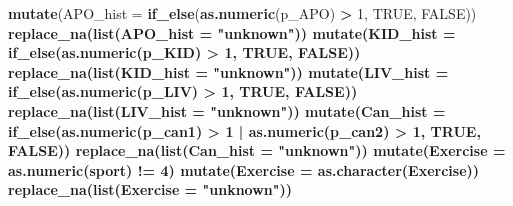 \documentclass[
]{article}
\newenvironment{Shaded}{\begin{snugshade}}{\end{snugshade}}
\newcommand{\CommentTok}[1]{\textcolor[rgb]{0.56,0.35,0.01}{\textit{#1}}}
\newcommand{\DataTypeTok}[1]{\textcolor[rgb]{0.13,0.29,0.53}{#1}}
\newcommand{\DecValTok}[1]{\textcolor[rgb]{0.00,0.00,0.81}{#1}}
\newcommand{\KeywordTok}[1]{\textcolor[rgb]{0.13,0.29,0.53}{\textbf{#1}}}
\newcommand{\NormalTok}[1]{#1}
\newcommand{\OperatorTok}[1]{\textcolor[rgb]{0.81,0.36,0.00}{\textbf{#1}}}
\newcommand{\OtherTok}[1]{\textcolor[rgb]{0.56,0.35,0.01}{#1}}
\newcommand{\StringTok}[1]{\textcolor[rgb]{0.31,0.60,0.02}{#1}}
\begin{document}
\begin{Shaded}
\begin{Highlighting}[]
{{{{{{{{{{{{{{{{{{\StringTok{  }\KeywordTok{mutate}\NormalTok{(}\DataTypeTok{APO_hist =} \KeywordTok{if_else}\NormalTok{(}\KeywordTok{as.numeric}\NormalTok{(p_APO) }\OperatorTok{>}\StringTok{ }\DecValTok{1}\NormalTok{, }\OtherTok{TRUE}\NormalTok{, }\OtherTok{FALSE}\NormalTok{)) }\OperatorTok{%
\StringTok{  }\KeywordTok{replace_na}\NormalTok{(}\KeywordTok{list}\NormalTok{(}\DataTypeTok{APO_hist =} \StringTok{"unknown"}\NormalTok{)) }\OperatorTok{%
\StringTok{  }\KeywordTok{mutate}\NormalTok{(}\DataTypeTok{KID_hist =} \KeywordTok{if_else}\NormalTok{(}\KeywordTok{as.numeric}\NormalTok{(p_KID) }\OperatorTok{>}\StringTok{ }\DecValTok{1}\NormalTok{, }\OtherTok{TRUE}\NormalTok{, }\OtherTok{FALSE}\NormalTok{)) }\OperatorTok{%
\StringTok{  }\KeywordTok{replace_na}\NormalTok{(}\KeywordTok{list}\NormalTok{(}\DataTypeTok{KID_hist =} \StringTok{"unknown"}\NormalTok{)) }\OperatorTok{%
\StringTok{  }\KeywordTok{mutate}\NormalTok{(}\DataTypeTok{LIV_hist =} \KeywordTok{if_else}\NormalTok{(}\KeywordTok{as.numeric}\NormalTok{(p_LIV) }\OperatorTok{>}\StringTok{ }\DecValTok{1}\NormalTok{, }\OtherTok{TRUE}\NormalTok{, }\OtherTok{FALSE}\NormalTok{)) }\OperatorTok{%
\StringTok{  }\KeywordTok{replace_na}\NormalTok{(}\KeywordTok{list}\NormalTok{(}\DataTypeTok{LIV_hist =} \StringTok{"unknown"}\NormalTok{)) }\OperatorTok{%
\StringTok{  }\KeywordTok{mutate}\NormalTok{(}\DataTypeTok{Can_hist =} \KeywordTok{if_else}\NormalTok{(}\KeywordTok{as.numeric}\NormalTok{(p_can1) }\OperatorTok{>}\StringTok{ }\DecValTok{1} \OperatorTok{|}\StringTok{ }
\StringTok{                              }\KeywordTok{as.numeric}\NormalTok{(p_can2) }\OperatorTok{>}\StringTok{ }\DecValTok{1}\NormalTok{, }\OtherTok{TRUE}\NormalTok{, }\OtherTok{FALSE}\NormalTok{)) }\OperatorTok{%
\StringTok{  }\KeywordTok{replace_na}\NormalTok{(}\KeywordTok{list}\NormalTok{(}\DataTypeTok{Can_hist =} \StringTok{"unknown"}\NormalTok{)) }\OperatorTok{%
\StringTok{  }\KeywordTok{mutate}\NormalTok{(}\DataTypeTok{Exercise =} \KeywordTok{as.numeric}\NormalTok{(sport) }\OperatorTok{!=}\StringTok{ }\DecValTok{4}\NormalTok{) }\OperatorTok{%
\StringTok{  }\KeywordTok{mutate}\NormalTok{(}\DataTypeTok{Exercise =} \KeywordTok{as.character}\NormalTok{(Exercise)) }\OperatorTok{%
\StringTok{  }\KeywordTok{replace_na}\NormalTok{(}\KeywordTok{list}\NormalTok{(}\DataTypeTok{Exercise =} \StringTok{"unknown"}\NormalTok{)) }\OperatorTok{%
}}}}}}}}}}}}}}}}}}}}}}}}}}}}}
\end{Highlighting}
\end{Shaded}
\end{document}
